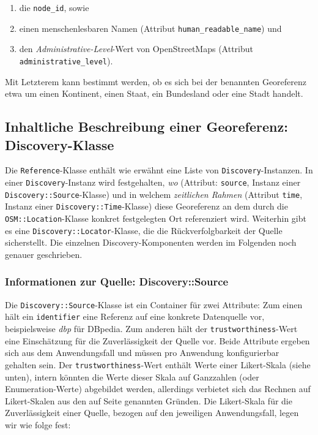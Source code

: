 \begin{enumerate}
  \item die \texttt{node\_id}, sowie 
  \item einen menschenlesbaren Namen (Attribut \texttt{human\_readable\_name}) und 
  \item den \textit{Administrative-Level}-Wert von OpenStreetMaps\cite{OSMadminlevel} (Attribut \texttt{administrative\_level}). 
\end{enumerate}

Mit Letzterem kann bestimmt werden, ob es sich bei der benannten Georeferenz etwa um einen Kontinent, einen Staat, ein Bundesland oder eine Stadt handelt.

\subsection{Inhaltliche Beschreibung einer Georeferenz: Discovery-Klasse}
Die \texttt{Reference}-Klasse enthält wie erwähnt eine Liste von \texttt{Discovery}-Instanzen. In einer \texttt{Discovery}-Instanz wird festgehalten, \textit{wo} (Attribut: \texttt{source}, Instanz einer \texttt{Discovery::Source}-Klasse) und in welchem \textit{zeitlichen Rahmen} (Attribut \texttt{time}, Instanz einer \texttt{Discovery::Time}-Klasse) diese Georeferenz an dem durch die \texttt{OSM::Location}-Klasse konkret festgelegten Ort referenziert wird. Weiterhin gibt es eine \texttt{Discovery::Locator}-Klasse, die die Rückverfolgbarkeit der Quelle sicherstellt. Die einzelnen Discovery-Komponenten werden im Folgenden noch genauer geschrieben.

\subsubsection{Informationen zur Quelle: Discovery::Source}
Die \texttt{Discovery::Source}-Klasse ist ein Container für zwei Attribute: Zum einen hält ein \texttt{identifier} eine Referenz auf eine konkrete Datenquelle vor, beispielsweise \textit{dbp} für DBpedia. Zum anderen hält der \texttt{trustworthiness}-Wert eine Einschätzung für die Zuverlässigkeit der Quelle vor. Beide Attribute ergeben sich aus dem Anwendungsfall und müssen pro Anwendung konfigurierbar gehalten sein. Der \texttt{trustworthiness}-Wert enthält Werte einer Likert-Skala (siehe unten), intern könnten die Werte dieser Skala auf Ganzzahlen (oder Enumeration-Werte) abgebildet werden, allerdings verbietet sich das Rechnen auf Likert-Skalen aus den auf Seite \pageref{calc_likert} genannten Gründen. Die Likert-Skala für die Zuverlässigkeit einer Quelle, bezogen auf den jeweiligen Anwendungsfall, legen wir wie folge fest:

